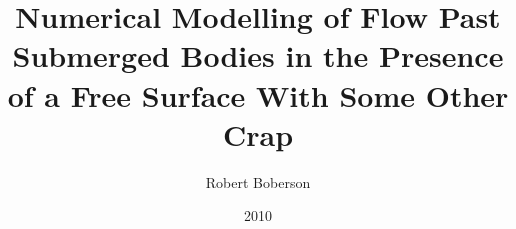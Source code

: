 \documentclass[fancychap]{edengths}
\author{Robert Boberson}
\title{Numerical Modelling of Flow
Past Submerged Bodies in the Presence of a Free Surface
With Some Other Crap}
\date{2010}
\begin{document}
\maketitle


%
\begin{precontent}
\dedication{To Mum and Dad}
\end{precontent}

\pagestyle{main}
\tableofcontents
\clearpage
\listoffigures
\clearpage

\newpage
{}
\setcounter{page}{1}


%
%
%
%
%
%

\appendix
\noappendicestocpagenum
\addappheadtotoc
\renewcommand{\chaptername}{Appendix}
\renewcommand{\theequation}{\Alph{chapter}.\arabic{equation}}

%
%
%
%
%
%
%



{}

\end{document}
